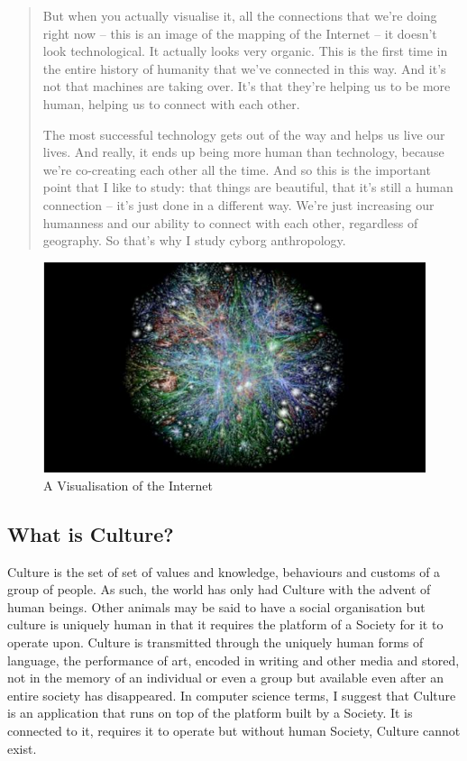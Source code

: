 \begin{quotation}
But when you actually visualise it, all the connections that we're doing right now -- this is an image of the mapping of the Internet -- it doesn't look technological. It actually looks very organic. This is the first time in the entire history of humanity that we've connected in this way. And it's not that machines are taking over. It's that they're helping us to be more human, helping us to connect with each other.

The most successful technology gets out of the way and helps us live our lives. And really, it ends up being more human than technology, because we're co-creating each other all the time. And so this is the important point that I like to study: that things are beautiful, that it's still a human connection -- it's just done in a different way. We're just increasing our humanness and our ability to connect with each other, regardless of geography. So that's why I study cyborg anthropology\cite{RefWorks:99}.
\end{quotation}

\begin{figure}
\includegraphics{figures/AmberCaseWeAreAllCyborgsNowInternetMap.jpg}
\caption{A Visualisation of the Internet\cite{RefWorks:99}}
\end{figure}




\subsection{What is Culture?}
Culture is the set of set of values and knowledge, behaviours and customs of  a group of people. As such, the world has only had Culture with the advent of human beings. Other animals may be said to have a social organisation but culture is uniquely human in that it requires the platform of a Society for it to operate upon. Culture is transmitted through the uniquely human forms of language, the performance of art, encoded in writing and other media and stored, not in the memory of an individual or even a group but available even after an entire society has disappeared. 
In computer science terms, I suggest that Culture is an application that runs on top of the platform built by a Society. It is connected to it, requires it to operate but without human Society, Culture cannot exist.

